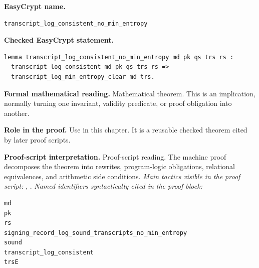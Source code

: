 \begin{formaltheorem}
\noindent\textbf{EasyCrypt name.}
\begin{lstlisting}[language=EasyCrypt,basicstyle=\ttfamily\scriptsize]
transcript_log_consistent_no_min_entropy
\end{lstlisting}
\noindent\textbf{Checked EasyCrypt statement.}
\begin{lstlisting}[language=EasyCrypt,basicstyle=\ttfamily\scriptsize]
lemma transcript_log_consistent_no_min_entropy md pk qs trs rs :
  transcript_log_consistent md pk qs trs rs =>
  transcript_log_min_entropy_clear md trs.
\end{lstlisting}
\noindent\textbf{Formal mathematical reading.}
Mathematical theorem. This is an implication, normally turning one invariant, validity predicate, or proof obligation into another.

\noindent\textbf{Role in the proof.}
Use in this chapter. It is a reusable checked theorem cited by later proof scripts.

\noindent\textbf{Proof-script interpretation.}
Proof-script reading. The machine proof decomposes the theorem into rewrites, program-logic obligations, relational equivalences, and arithmetic side conditions.
\emph{Main tactics visible in the proof script:} , .
\emph{Named identifiers syntactically cited in the proof block:}
\begin{lstlisting}[language=EasyCrypt,basicstyle=\ttfamily\scriptsize]
md
pk
rs
signing_record_log_sound_transcripts_no_min_entropy
sound
transcript_log_consistent
trsE
\end{lstlisting}

\end{formaltheorem}


